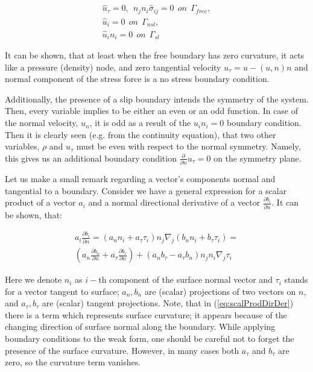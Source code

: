 \begin{subequations}
\begin{align}
    \hat{u}_{\tau} = 0, \ \ n_j n_i \hat{\sigma}_{ij} = 0 \ \ on  \ \ \Gamma_{free}, \\
    \hat{u}_i = 0 \ \ on \ \ \Gamma_{nsl},\\
    \hat{u}_i n_i = 0 \ \ on \ \ \Gamma_{sl}
\end{align}
\end{subequations}

It can be shown, that at least when the free boundary has zero curvature, it acts like a pressure (density) node, and zero tangential velocity $u_{\tau} = u - (u,n) n$ and normal component of the stress force is a no stress boundary condition.

Additionally, the presence of a slip boundary intends the symmetry of the system. Then, every variable implies to be either an even or an odd function. In case of the normal velocity, $u_n$, it is odd as a result of the $u_i n_i = 0$ boundary condition. Then it is clearly seen (e.g. from the continuity equation), that two other variables, $\rho$ and $u_{\tau}$ must be even with respect to the normal symmetry. Namely, this gives us an additional boundary condition $\frac{\partial}{\partial n}u_{\tau}= 0$ on the symmetry plane.

Let us make a small remark regarding a vector's components normal and tangential to a boundary. Consider we have a general expression for a scalar product of a vector $a_i$ and a normal directional derivative of a vector $\frac{\partial b_i}{\partial n}$. It can be shown, that:

\begin{subequations}
\begin{align}
    a_i \frac{\partial b_i}{\partial n} = \left(a_n n_i + a_{\tau} \tau_i \right) n_j \nabla_j \left( b_n n_i + b_{\tau} \tau_i \right) = \\
    \label{eq:scalProdDirDer}
    \left(a_n \frac{\partial b_n}{\partial n} + a_{\tau} \frac{\partial b_{\tau}}{\partial n} \right) + \left(a_n b_{\tau} - a_{\tau} b_n \right) n_j n_i \nabla_j \tau_i
\end{align}
\end{subequations}

Here we denote $n_i$ as $i-$th component of the surface normal vector and ${\tau}_i$ stands for a vector tangent to surface; $a_n, b_n$ are (scalar) projections of two vectors on $n$, and $a_{\tau}, b_{\tau}$ are (scalar) tangent projections. Note, that in (\ref{eq:scalProdDirDer}) there is a term which represents surface curvature; it appears because of the changing direction of surface normal along the boundary. While applying boundary conditions to the weak form, one should be careful not to forget the presence of the surface curvature. However, in many cases both $a_{\tau}$ and $b_{\tau}$ are zero, so the curvature term vanishes. 


